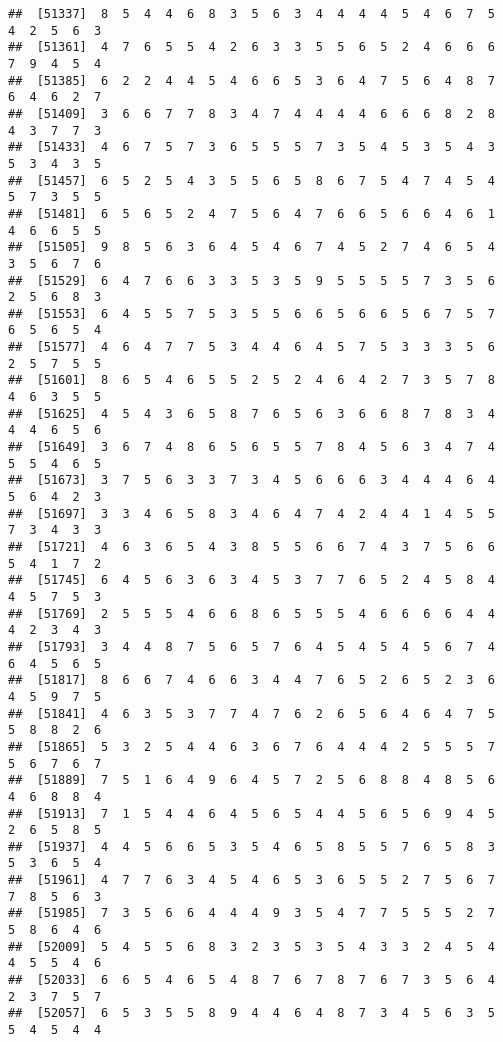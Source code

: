 \documentclass[
]{book}
\begin{document}
\begin{verbatim}
##  [51337]  8  5  4  4  6  8  3  5  6  3  4  4  4  4  5  4  6  7  5  4  2  5  6  3
##  [51361]  4  7  6  5  5  4  2  6  3  3  5  5  6  5  2  4  6  6  6  7  9  4  5  4
##  [51385]  6  2  2  4  4  5  4  6  6  5  3  6  4  7  5  6  4  8  7  6  4  6  2  7
##  [51409]  3  6  6  7  7  8  3  4  7  4  4  4  4  6  6  6  8  2  8  4  3  7  7  3
##  [51433]  4  6  7  5  7  3  6  5  5  5  7  3  5  4  5  3  5  4  3  5  3  4  3  5
##  [51457]  6  5  2  5  4  3  5  5  6  5  8  6  7  5  4  7  4  5  4  5  7  3  5  5
##  [51481]  6  5  6  5  2  4  7  5  6  4  7  6  6  5  6  6  4  6  1  4  6  6  5  5
##  [51505]  9  8  5  6  3  6  4  5  4  6  7  4  5  2  7  4  6  5  4  3  5  6  7  6
##  [51529]  6  4  7  6  6  3  3  5  3  5  9  5  5  5  5  7  3  5  6  2  5  6  8  3
##  [51553]  6  4  5  5  7  5  3  5  5  6  6  5  6  6  5  6  7  5  7  6  5  6  5  4
##  [51577]  4  6  4  7  7  5  3  4  4  6  4  5  7  5  3  3  3  5  6  2  5  7  5  5
##  [51601]  8  6  5  4  6  5  5  2  5  2  4  6  4  2  7  3  5  7  8  4  6  3  5  5
##  [51625]  4  5  4  3  6  5  8  7  6  5  6  3  6  6  8  7  8  3  4  4  4  6  5  6
##  [51649]  3  6  7  4  8  6  5  6  5  5  7  8  4  5  6  3  4  7  4  5  5  4  6  5
##  [51673]  3  7  5  6  3  3  7  3  4  5  6  6  6  3  4  4  4  6  4  5  6  4  2  3
##  [51697]  3  3  4  6  5  8  3  4  6  4  7  4  2  4  4  1  4  5  5  7  3  4  3  3
##  [51721]  4  6  3  6  5  4  3  8  5  5  6  6  7  4  3  7  5  6  6  5  4  1  7  2
##  [51745]  6  4  5  6  3  6  3  4  5  3  7  7  6  5  2  4  5  8  4  4  5  7  5  3
##  [51769]  2  5  5  5  4  6  6  8  6  5  5  5  4  6  6  6  6  4  4  4  2  3  4  3
##  [51793]  3  4  4  8  7  5  6  5  7  6  4  5  4  5  4  5  6  7  4  6  4  5  6  5
##  [51817]  8  6  6  7  4  6  6  3  4  4  7  6  5  2  6  5  2  3  6  4  5  9  7  5
##  [51841]  4  6  3  5  3  7  7  4  7  6  2  6  5  6  4  6  4  7  5  5  8  8  2  6
##  [51865]  5  3  2  5  4  4  6  3  6  7  6  4  4  4  2  5  5  5  7  5  6  7  6  7
##  [51889]  7  5  1  6  4  9  6  4  5  7  2  5  6  8  8  4  8  5  6  4  6  8  8  4
##  [51913]  7  1  5  4  4  6  4  5  6  5  4  4  5  6  5  6  9  4  5  2  6  5  8  5
##  [51937]  4  4  5  6  6  5  3  5  4  6  5  8  5  5  7  6  5  8  3  5  3  6  5  4
##  [51961]  4  7  7  6  3  4  5  4  6  5  3  6  5  5  2  7  5  6  7  7  8  5  6  3
##  [51985]  7  3  5  6  6  4  4  4  9  3  5  4  7  7  5  5  5  2  7  5  8  6  4  6
##  [52009]  5  4  5  5  6  8  3  2  3  5  3  5  4  3  3  2  4  5  4  4  5  5  4  6
##  [52033]  6  6  5  4  6  5  4  8  7  6  7  8  7  6  7  3  5  6  4  2  3  7  5  7
##  [52057]  6  5  3  5  5  8  9  4  4  6  4  8  7  3  4  5  6  3  5  5  4  5  4  4

\end{verbatim}
\end{document}
